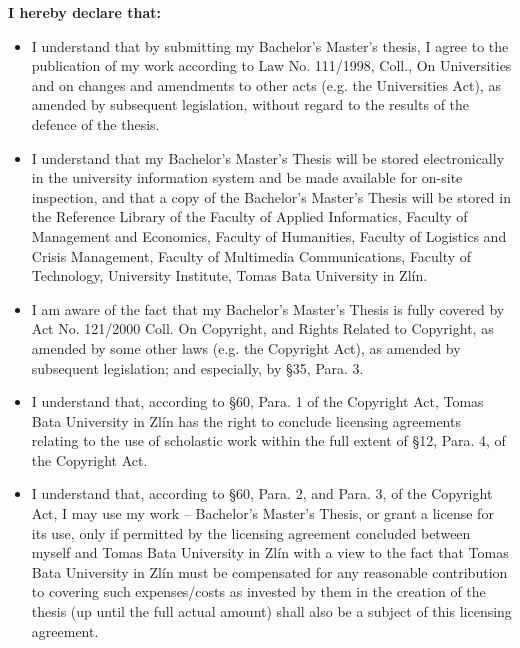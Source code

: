 {{	\else \ifenglish
	\textbf{I hereby declare that:}
	\begin{itemize}
		\setlength{\parskip}{0pt}
		\setlength{\itemsep}{0pt}
		\item{I understand that by submitting my \ifbp Bachelor's \else\ifdp Master's \fi\fi thesis, I agree to the publication of my work according to Law No. 111/1998, Coll., On Universities and on changes and amendments to other acts (e.g. the Universities Act), as amended by subsequent legislation, without regard to the results of the defence of the thesis.}		
		\item{I understand that my \ifbp Bachelor's \else\ifdp Master's \fi\fi Thesis will be stored electronically in the university information system and be made available for on-site inspection, and that a copy of the \ifbp Bachelor's \else\ifdp Master's \fi\fi Thesis will be stored in the Reference Library of the 
		\iffai Faculty of Applied Informatics, \else\iffame Faculty of Management and Economics, \else \iffhs Faculty of Humanities, \else\ifflkr Faculty of Logistics and Crisis Management, \else\iffmk Faculty of Multimedia Communications, \else\ifft Faculty of Technology, \else\ifuni University Institute, \if \fi \fi \fi \fi \fi \fi \fi \fi Tomas Bata University in Zlín.}
		\item{I am aware of the fact that my \ifbp Bachelor's \else\ifdp Master's \fi\fi Thesis is fully covered by Act No. 121/2000 Coll. On Copyright, and Rights Related to Copyright, as amended by some other laws (e.g. the Copyright Act), as amended by subsequent legislation; and especially, by §35, Para. 3.}
		\item{I understand that, according to §60, Para. 1 of the Copyright Act, Tomas Bata University in Zlín has the right to conclude licensing agreements relating to the use of scholastic work within the full extent of §12, Para. 4, of the Copyright Act.}
		\item{I understand that, according to §60, Para. 2, and Para. 3, of the Copyright Act, I may use my work – \ifbp Bachelor's \else\ifdp Master's \fi\fi Thesis, or grant a license for its use, only if permitted by the licensing agreement concluded between myself and Tomas Bata University in Zlín with a view to the fact that Tomas Bata University in Zlín must be compensated for any reasonable contribution to covering such expenses/costs as invested by them in the creation of the thesis (up until the full actual amount) shall also be a subject of this licensing agreement.}

\end{itemize}}}
